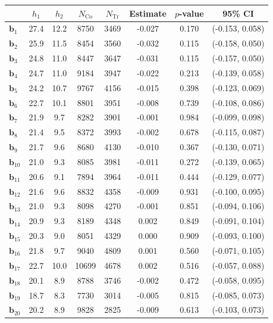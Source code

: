 \documentclass[10pt]{article}
\newcommand{\bb}{\mathbf{b}}
\begin{document}
\begin{table}[p]
    \centering
\begin{tabular}{lccccccc}
  \toprule\toprule
   & $h_1$ & $h_2$ & $N_{\mathrm{Co}}$ & $N_{\mathrm{Tr}}$ & Estimate & $p$-value & 95\% CI \\
  \midrule
   $\bb_{1}$ & 27.4 & 12.2 & 8750 & 3469 & -0.027 & 0.170 & (-0.153, 0.058)\\
   $\bb_{2}$ & 25.9 & 11.5 & 8454 & 3560 & -0.032 & 0.115 & (-0.158, 0.050)\\
   $\bb_{3}$ & 24.8 & 11.0 & 8447 & 3647 & -0.031 & 0.115 & (-0.157, 0.050)\\
   $\bb_{4}$ & 24.7 & 11.0 & 9184 & 3947 & -0.022 & 0.213 & (-0.139, 0.058)\\
   $\bb_{5}$ & 24.2 & 10.7 & 9767 & 4156 & -0.015 & 0.398 & (-0.123, 0.069)\\
   $\bb_{6}$ & 22.7 & 10.1 & 8801 & 3951 & -0.008 & 0.739 & (-0.108, 0.086)\\
   $\bb_{7}$ & 21.9 & 9.7 & 8282 & 3901 & -0.001 & 0.984 & (-0.099, 0.098)\\
   $\bb_{8}$ & 21.4 & 9.5 & 8372 & 3993 & -0.002 & 0.678 & (-0.115, 0.087)\\
   $\bb_{9}$ & 21.7 & 9.6 & 8680 & 4130 & -0.010 & 0.367 & (-0.130, 0.071)\\
   $\bb_{10}$ & 21.0 & 9.3 & 8085 & 3981 & -0.011 & 0.272 & (-0.139, 0.065)\\
   $\bb_{11}$ & 20.6 & 9.1 & 7894 & 3964 & -0.011 & 0.444 & (-0.129, 0.077)\\
   $\bb_{12}$ & 21.6 & 9.6 & 8832 & 4358 & -0.009 & 0.931 & (-0.100, 0.095)\\
   $\bb_{13}$ & 21.0 & 9.3 & 8098 & 4270 & -0.001 & 0.851 & (-0.094, 0.106)\\
   $\bb_{14}$ & 20.9 & 9.3 & 8189 & 4348 & 0.002 & 0.849 & (-0.091, 0.104)\\
   $\bb_{15}$ & 20.3 & 9.0 & 8051 & 4329 & 0.000 & 0.909 & (-0.093, 0.100)\\
   $\bb_{16}$ & 21.8 & 9.7 & 9040 & 4809 & 0.001 & 0.560 & (-0.071, 0.105)\\
   $\bb_{17}$ & 22.7 & 10.0 & 10699 & 4678 & 0.002 & 0.516 & (-0.057, 0.088)\\
   $\bb_{18}$ & 20.1 & 8.9 & 8788 & 3746 & -0.002 & 0.472 & (-0.058, 0.095)\\
   $\bb_{19}$ & 18.7 & 8.3 & 7730 & 3014 & -0.005 & 0.815 & (-0.085, 0.073)\\
   $\bb_{20}$ & 20.2 & 8.9 & 9828 & 2825 & -0.009 & 0.613 & (-0.103, 0.073)\\

\end{tabular}
\end{table}
\end{document}
